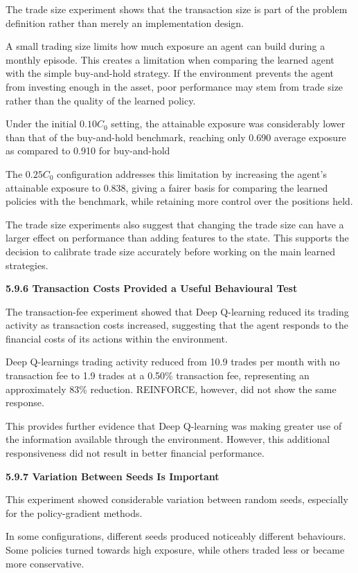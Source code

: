 The trade size experiment shows that the transaction size is part of the
problem definition rather than merely an implementation design.

A small trading size limits how much exposure an agent can build during
a monthly episode. This creates a limitation when comparing the learned
agent with the simple buy-and-hold strategy. If the environment prevents
the agent from investing enough in the asset, poor performance may stem
from trade size rather than the quality of the learned policy.

Under the initial \(0.10C_{0}\) setting, the attainable exposure was
considerably lower than that of the buy-and-hold benchmark, reaching
only 0.690 average exposure as compared to 0.910 for buy-and-hold

The \(0.25C_{0}\) configuration addresses this limitation by increasing
the agent's attainable exposure to 0.838, giving a fairer basis for
comparing the learned policies with the benchmark, while retaining more
control over the positions held.

The trade size experiments also suggest that changing the trade size can
have a larger effect on performance than adding features to the state.
This supports the decision to calibrate trade size accurately before
working on the main learned strategies.

\textbf{5.9.6 Transaction Costs Provided a Useful Behavioural Test}

The transaction-fee experiment showed that Deep Q-learning reduced its
trading activity as transaction costs increased, suggesting that the
agent responds to the financial costs of its actions within the
environment.

Deep Q-learning\textquotesingle s trading activity reduced from 10.9
trades per month with no transaction fee to 1.9 trades at a 0.50\%
transaction fee, representing an approximately 83\% reduction.
REINFORCE, however, did not show the same response.

This provides further evidence that Deep Q-learning was making greater
use of the information available through the environment. However, this
additional responsiveness did not result in better financial
performance.

\textbf{5.9.7 Variation Between Seeds Is Important}

This experiment showed considerable variation between random seeds,
especially for the policy-gradient methods.

In some configurations, different seeds produced noticeably different
behaviours. Some policies turned towards high exposure, while others
traded less or became more conservative.

